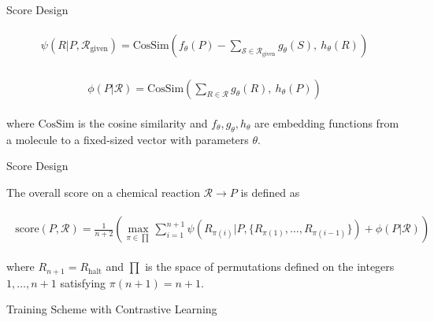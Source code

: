\documentclass{beamer}		%
\begin{document}
\begin{frame}{Score Design}

\begin{eqnarray*}
\begin{aligned}
\psi(R|P, \mathcal{R}_{\text{given}}) =\text{CosSim} \left( f_{\theta}(P)-\sum_{\mathcal{S}\in\mathcal{R}_{\text{given}}} g_{\theta}(S), \  h_{\theta}(R) \right)
\end{aligned}    
\end{eqnarray*}

\begin{eqnarray*}
\begin{aligned}
\phi(P|\mathcal{R}) = \text{CosSim} \left( \sum_{R\in\mathcal{R}} g_{\theta}(R) , \ h_{\theta}(P) \right)
\end{aligned}    
\end{eqnarray*}

where $\text{CosSim}$ is the cosine similarity and $f_\theta, g_\theta, h_\theta$ are embedding functions from a molecule to a fixed-sized vector with parameters $\theta$.

\end{frame}



\begin{frame}{Score Design}

The overall score on a chemical reaction $\mathcal{R} \to P$ is defined as

\begin{eqnarray*}
\begin{aligned}
\text{score}(P, \mathcal{R})=\frac{1}{n+2} \left( \max_{\pi \in \prod} \sum_{i=1}^{n+1} \psi(R_{\pi(i)}|P, \{R_{\pi(1)}, \ldots, R_{\pi(i-1)}\}) + \phi(P|\mathcal{R}) \right)
\end{aligned}    
\end{eqnarray*}

where $R_{n+1}=R_{\text{halt}}$ and $\prod$ is the space of permutations defined on the integers $1, \ldots, n+1$ satisfying $\pi(n+1)=n+1$.

\end{frame}



\begin{frame}[noframenumbering]
\begin{itemize}
    \begin{LARGE}
    \item {}
    \item {}
    \item Training Scheme with Contrastive Learning
    \item {}
    \end{LARGE}
\end{itemize}
\end{frame}
\end{document}
